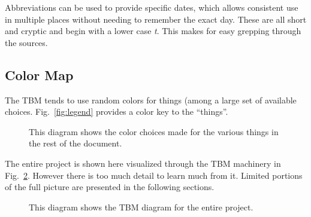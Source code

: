 Abbreviations can be used to provide specific dates, which allows
consistent use in multiple places without needing to remember the
exact day.  These are all short and cryptic and begin with a lower
case \textit{t}.  This makes for easy grepping through the sources.


\subsection{Color Map}

The \ac{TBM} tends to use random colors for things (among a large
set of available choices.  Fig.~\ref{fig:legend} provides a color
key to the ``things''.
\begin{figure}[p!]%
\captionsetup{width=0.6\linewidth}
\caption[Color Legend]{This diagram shows the color choices made
for the various things in the rest of the document.}
\label{fig:umlclass}
\end{figure}

The entire project is shown here visualized through the \ac{TBM}
machinery in Fig.~\ref{fig:allofit}.  However there is too much
detail to learn much from it.  Limited portions of the full picture
are presented in the following sections.
\begin{figure}[p!]%
\captionsetup{width=0.6\linewidth}
\caption[Everything]{This diagram shows the \ac{TBM} diagram
for the entire project.}
\label{fig:allofit}
\end{figure}

%
%
